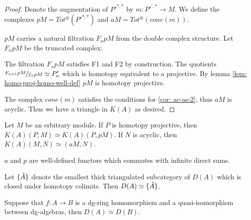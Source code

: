 \documentclass[../thesis.tex]{subfiles}
\begin{document}
\begin{proof}
                Denote the augmentation of $P'^{*,*}$ by $m : P'^{',*} \rightarrow M$. We define the complexes $pM = Tot^\oplus(P'^{*,*})$ and $aM = Tot^\oplus(cone(m))$.
                
                $pM$ carries a natural filtration $F_npM$ from the double complex structure. Let $F_npM$ be the truncated complex:
                \begin{center}
                \end{center}
                
                The filtration $F_npM$ satisfies F1 and F2 by construction. The quotients $\sfrac{F_{n+1}pM}{f_npM} \simeq P'_n$ which is homotopy equivalent to a projective. By lemma \ref{lem: homo-proj-homo-well-def} $pM$ is homotopy projective.
                
                The complex $cone(m)$ satisfies the conditions for \ref{cor: ac-as-2}, thus $aM$ is acyclic. Thus we have a triangle in $K(A)$ as desired.
            \end{proof}

            \begin{corollary}
                Let $M$ be an erbitrary module. If $P$ is homotopy projective, then $K(A)(P,M) \simeq K(A)(P, pM)$. If $N$ is acyclic, then $K(A)(M, N) \simeq (aM, N)$.

                $a$ and $p$ are well-defined functors which commutes with infinite direct sums. 
            \end{corollary}

            \begin{corollary}
                Let ${\{\hat{A}\}}$ denote the smallest thick triangulated subcategory of $D(A)$ which is closed under homotopy colimits. Then $D(A) \simeq {\{\hat{A}\}}$.
            \end{corollary}

            \begin{corollary}\label{cor: ring-qiso-is-eq}
                Suppose that $f : A \rightarrow B$ is a dg-ring homomorphism  and a quasi-isomorphism between dg-algebras, then $D(A) \simeq D(B)$.
            \end{corollary}
\end{document}
